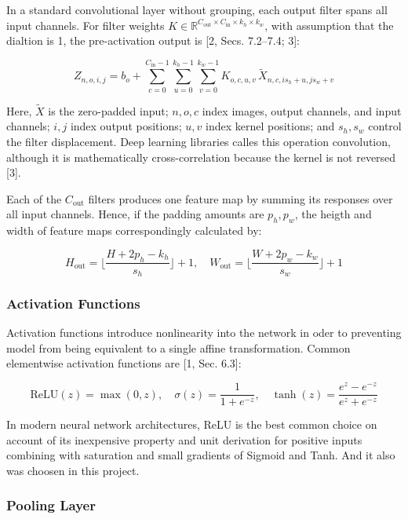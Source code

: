 In a standard convolutional layer without grouping, each output filter spans all input channels. For filter weights \(K\in {\mathbb{R}}^{{C}_{\mathrm{out}}\times {C}_{\mathrm{in}}\times {k}_{h}\times {k}_{w}}\), with assumption that the dialtion is 1, the pre-activation output is [2, Secs. 7.2--7.4; 3]:

\[
{Z}_{n,o,i,j}={b}_{o}+\sum _{c=0}^{{C}_{\mathrm{in}}-1} \sum _{u=0}^{{k}_{h}-1} \sum _{v=0}^{{k}_{w}-1} {K}_{o,c,u,v}\,{\tilde{X}}_{n,c,i{s}_{h}+u,j{s}_{w}+v}
\]

Here, \(\tilde{X}\) is the zero-padded input; \(n,o,c\) index images, output channels, and input channels; \(i,j\) index output positions; \(u,v\) index kernel positions; and \({s}_{h},{s}_{w}\) control the filter displacement. Deep learning libraries calles this operation convolution, although it is mathematically cross-correlation because the kernel is not reversed [3].

Each of the \({C}_{\mathrm{out}}\) filters produces one feature map by summing its responses over all input channels. Hence, if the padding amounts are \({p}_{h},{p}_{w}\), the heigth and width of feature maps correspondingly calculated by:

\[
{H}_{\mathrm{out}}=\lfloor \frac{H+2{p}_{h}-{k}_{h}}{{s}_{h}}\rfloor +1,\quad {W}_{\mathrm{out}}=\lfloor \frac{W+2{p}_{w}-{k}_{w}}{{s}_{w}}\rfloor +1
\]

\subsubsection{Activation Functions}\label{theory:2.2.3}

Activation functions introduce nonlinearity into the network in oder to preventing model from being  equivalent to a single affine transformation. Common elementwise activation functions are [1, Sec. 6.3]:

\[
\mathrm{ReLU}(z)=\max (0,z),\quad \sigma (z)=\frac{1}{1+{e}^{-z}},\quad \tanh (z)=\frac{{e}^{z}-{e}^{-z}}{{e}^{z}+{e}^{-z}}
\]

In modern neural network architectures, ReLU is the best common choice on account of its inexpensive property and unit derivation for positive inputs combining with saturation and small gradients of Sigmoid and Tanh. And it also was choosen in this project.

\subsubsection{Pooling Layer}\label{theory:2.2.4}


